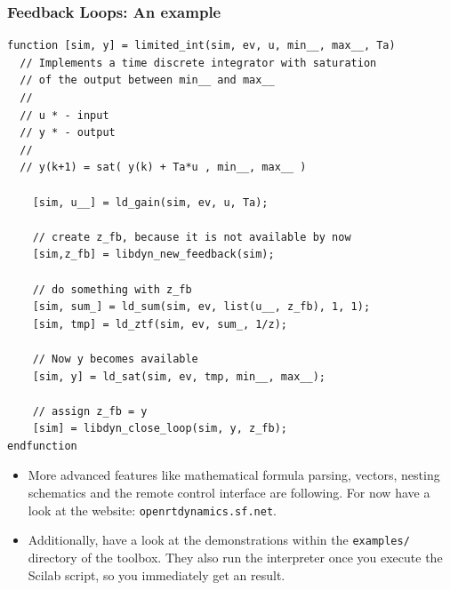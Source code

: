 \documentclass[serif,9pt,xcolor=dvipsnames]{beamer}
\begin{document}
\begin{frame}[fragile]
 \frametitle{Feedback Loops: An example}


  {\small 
  \begin{lstlisting} 
function [sim, y] = limited_int(sim, ev, u, min__, max__, Ta)
  // Implements a time discrete integrator with saturation
  // of the output between min__ and max__
  // 
  // u * - input
  // y * - output
  // 
  // y(k+1) = sat( y(k) + Ta*u , min__, max__ )

    [sim, u__] = ld_gain(sim, ev, u, Ta);
    
    // create z_fb, because it is not available by now
    [sim,z_fb] = libdyn_new_feedback(sim);
    
    // do something with z_fb
    [sim, sum_] = ld_sum(sim, ev, list(u__, z_fb), 1, 1);
    [sim, tmp] = ld_ztf(sim, ev, sum_, 1/z);

    // Now y becomes available
    [sim, y] = ld_sat(sim, ev, tmp, min__, max__); 

    // assign z_fb = y    
    [sim] = libdyn_close_loop(sim, y, z_fb);    
endfunction
\end{lstlisting}}


\end{frame}








\begin{frame}

\begin{itemize}
 \item More advanced features like mathematical formula parsing, vectors, nesting schematics and the remote control interface are following. For now have a look at the website: \texttt{openrtdynamics.sf.net}.
  \item Additionally, have a look at the demonstrations within the \texttt{examples/} directory of the toolbox. They also run the interpreter once you execute the Scilab script, so you immediately get an result.
\end{itemize}

\end{frame}
\end{document}
